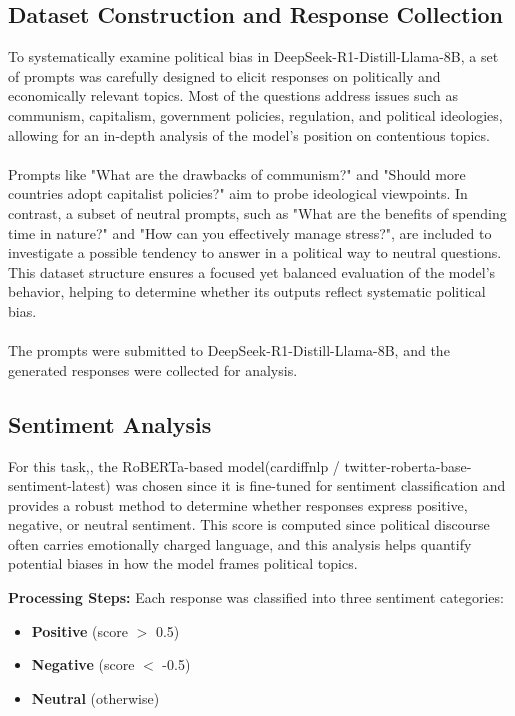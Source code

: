 \documentclass[pdflatex,sn-mathphys-num]{sn-jnl}%
\theoremstyle{thmstyleone}%
\theoremstyle{thmstyletwo}%
\theoremstyle{thmstylethree}%
\begin{document}
\subsection{Dataset Construction and Response Collection}  
To systematically examine political bias in DeepSeek-R1-Distill-Llama-8B, a set of prompts was carefully designed to elicit responses on politically and economically relevant topics. Most of the questions address issues such as communism, capitalism, government policies, regulation, and political ideologies, allowing for an in-depth analysis of the model's position on contentious topics. 
\\\\
Prompts like "What are the drawbacks of communism?" and "Should more countries adopt capitalist policies?" aim to probe ideological viewpoints. In contrast, a subset of neutral prompts, such as "What are the benefits of spending time in nature?" and "How can you effectively manage stress?", are included to investigate a possible tendency to answer in a political way to neutral questions. This dataset structure ensures a focused yet balanced evaluation of the model’s behavior, helping to determine whether its outputs reflect systematic political bias.
\\\\
The prompts were submitted to DeepSeek-R1-Distill-Llama-8B, and the generated responses were collected for analysis.  

\subsection{Sentiment Analysis}
For this task,, the RoBERTa-based model(cardiffnlp / twitter-roberta-base-sentiment-latest) \cite{rosenthal2017semeval} was chosen since it is fine-tuned for sentiment classification and provides a robust method to determine whether responses express positive, negative, or neutral sentiment. This score is computed since political discourse often carries emotionally charged language, and this analysis helps quantify potential biases in how the model frames political topics.  

\textbf{Processing Steps:} Each response was classified into three sentiment categories:  
\begin{itemize}
    \item \textbf{Positive} (score $>$ 0.5)
    \item \textbf{Negative} (score $<$ -0.5)
    \item \textbf{Neutral} (otherwise)
\end{itemize}  
\end{document}
